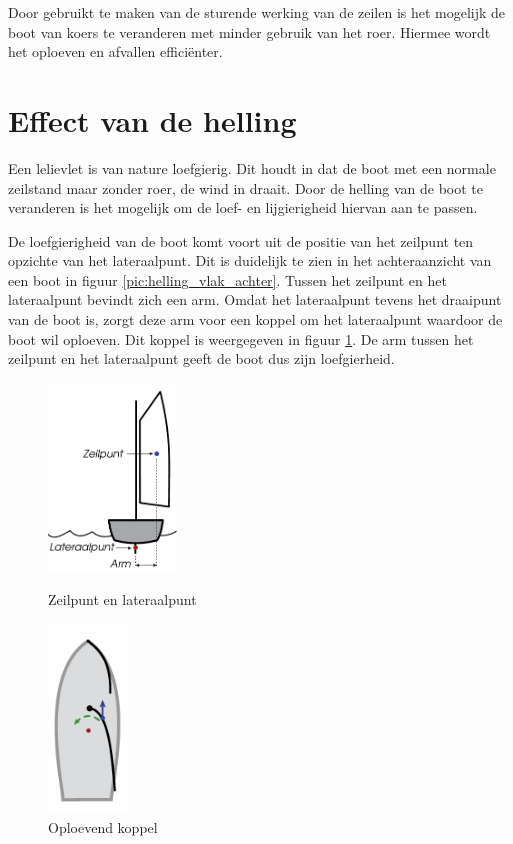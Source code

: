 Door gebruikt te maken van de sturende werking van de zeilen is het mogelijk de boot van koers te veranderen met minder gebruik van het roer. Hiermee wordt het oploeven en afvallen efficiënter.

\section{Effect van de helling}
Een lelievlet is van nature loefgierig. Dit houdt in dat de boot met een normale zeilstand maar zonder roer, de wind in draait. Door de helling van de boot te veranderen is het mogelijk om de loef- en lijgierigheid hiervan aan te passen.

De loefgierigheid van de boot komt voort uit de positie van het zeilpunt ten opzichte van het lateraalpunt. Dit is duidelijk te zien in het achteraanzicht van een boot in figuur \ref{pic:helling_vlak_achter}. Tussen het zeilpunt en het lateraalpunt bevindt zich een arm. Omdat het lateraalpunt tevens het draaipunt van de boot is, zorgt deze arm voor een koppel om het lateraalpunt waardoor de boot wil oploeven. Dit koppel is weergegeven in figuur \ref{pic:helling_valk_boven}. De arm tussen het zeilpunt en het lateraalpunt geeft de boot dus zijn loefgierheid.

\begin{figure}[H]
	\centering
	\begin{minipage}[b]{0.48\textwidth}
		\centering
		\includegraphics[height=5cm]{Hoofdstukken/Krachten/pdf/helling_vlak_achter.pdf}
		\caption{Zeilpunt en lateraalpunt}
		\label{pic:helling_vlak_achter}
	\end{minipage}
	\hfill
	\begin{minipage}[b]{0.48\textwidth}
		\centering
		\includegraphics[height=5cm]{Hoofdstukken/Krachten/pdf/helling_vlak_boven.pdf}
		\caption{Oploevend koppel}
		\label{pic:helling_valk_boven}
	\end{minipage}
\end{figure}


